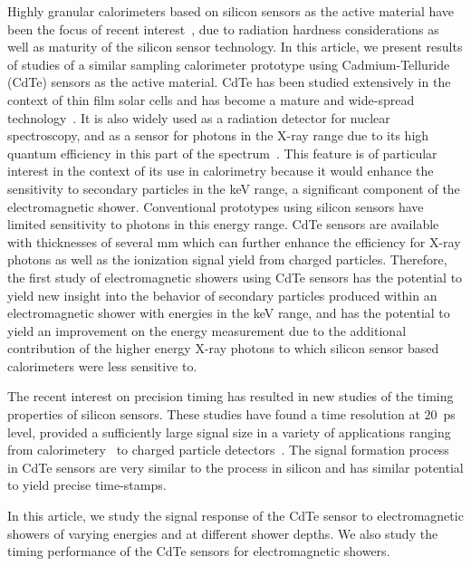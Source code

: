 Highly granular calorimeters based on silicon sensors as the active material 
have been the focus of recent interest~\cite{Adloff:2009,Butler:2020886}, due to
radiation hardness considerations as well as maturity of the silicon sensor
technology. In this article, we present results of studies of a similar
sampling calorimeter prototype using Cadmium-Telluride (CdTe) sensors as the 
active material. CdTe has been studied extensively in the context
of thin film solar cells and has become a mature and wide-spread
technology~\cite{cdtegeneric}. It is also widely used as a radiation
detector for nuclear spectroscopy, and as a sensor for photons in the X-ray range 
due to its high quantum efficiency in this part of the 
spectrum~\cite{cdtesensorsgeneric,cdtesensors1,cdtesensors2,cdtesensors3}.
This feature is of particular interest in the context of its use
in calorimetry because it would enhance the sensitivity to secondary particles in the keV range, 
a significant component of the electromagnetic shower. Conventional prototypes 
using silicon sensors have limited sensitivity to photons in this energy range. 
CdTe sensors are available with thicknesses of several mm which can further enhance the 
efficiency for X-ray photons as well as the ionization signal yield from charged particles.
Therefore, the first study of electromagnetic
showers using CdTe sensors has the potential to yield new insight
into the behavior of secondary particles produced within an 
electromagnetic shower with energies in the keV range, and has the potential
to yield an improvement on the energy measurement due to
the additional contribution of the higher energy X-ray photons to which silicon sensor
based calorimeters were less sensitive to.

The recent interest on precision timing has resulted in new studies of 
the timing properties of silicon sensors. 
These studies have found a time resolution 
at $20$~ps level, provided a sufficiently large signal size
in a variety of applications ranging from calorimetery~\cite{SiliconTiming} to 
charged particle detectors~\cite{santacruz}. The signal formation process
in CdTe sensors are very similar to the process in silicon and has 
similar potential to yield precise time-stamps.

In this article, we study the signal response of the CdTe sensor to electromagnetic
showers of varying energies and at different shower depths. We also study the timing
performance of the CdTe sensors for electromagnetic showers.

